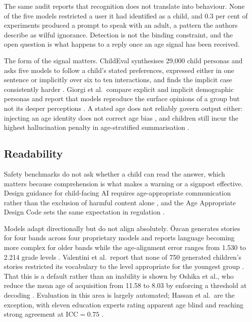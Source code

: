 The same audit reports that recognition does not translate into behaviour. None
of the five models restricted a user it had identified as a child, and 0.3 per
cent of experiments produced a prompt to speak with an adult, a pattern the
authors describe as wilful ignorance. Detection is not the binding constraint,
and the open question is what happens to a reply once an age signal has been
received.

The form of the signal matters. ChildEval synthesises 29,000 child personas and
asks five models to follow a child's stated preferences, expressed either in one
sentence or implicitly over six to ten interactions, and finds the implicit case
consistently harder \cite{luoChildEvalWhenLarge2026}. Giorgi et al.\ compare
explicit and implicit demographic personas and report that models reproduce the
surface opinions of a group but not its deeper perceptions
\cite{giorgiExplicitImplicitLarge2024}. A stated age does not reliably govern
output either: injecting an age identity does not correct age bias
\cite{liuGenerationGapExploring2024a}, and children still incur the highest
hallucination penalty in age-stratified summarisation
\cite{aghaebeLLMsNotSee2025a}.

\subsection{Readability}
\label{sec:rw_accessibility}

Safety benchmarks do not ask whether a child can read the answer, which matters
because comprehension is what makes a warning or a signpost effective. Design
guidance for child-facing AI requires age-appropriate communication rather than
the exclusion of harmful content alone \cite{yuPrinciplesSafeAI2025,
maLargeLanguageModelbased2025}, and the Age Appropriate Design Code sets the same
expectation in regulation \cite{UKAgeAppropriate2021}.

Models adapt directionally but do not align absolutely. Özcan generates stories
for four bands across four proprietary models and reports language becoming more
complex for older bands while the age-alignment error ranges from 1.530 to 2.214
grade levels \cite{ozcanEvaluatingChildAppropriateLanguage2026}. Valentini et al.\
report that none of 750 generated children's stories restricted its vocabulary to
the level appropriate for the youngest group
\cite{valentiniAutomaticGenerationSimplification2023}. That this is a default
rather than an inability is shown by Oshika et al., who reduce the mean age of
acquisition from 11.58 to 8.03 by enforcing a threshold at decoding
\cite{oshikaSimplifyingTranslationsChildren2024}. Evaluation in this area is
largely automated; Hassan et al.\ are the exception, with eleven education
experts rating apparent age blind and reaching strong agreement at
$\mathrm{ICC} = 0.75$ \cite{hassanEvaluatingLLMsGenerating2025}.

